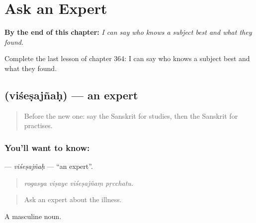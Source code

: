
\chapter{Ask an Expert}
\label{ch:sa-ask-an-expert}

\begin{chapteropening}
\textbf{By the end of this chapter:} \emph{I can say who knows a subject best and what they found.}

Complete the last lesson of chapter 364: I can say who knows a subject best and what they found.
\end{chapteropening}

\section[\texorpdfstring{\sk{विशेषज्ञः} (viśeṣajñaḥ)}{विशेषज्ञः (viśeṣajñaḥ)}]{ (viśeṣajñaḥ) — an expert}

\label{lesson:SA-C364-visesajnah}



\begin{quote}
Before the new one: say the Sanskrit for studies, then the Sanskrit for practises.
\end{quote}

\subsection*{You'll want to know: }
\textbf{} — \emph{viśeṣajñaḥ} — \textquotedblleft{}an expert\textquotedblright{}.

\begin{quote}
   
\end{quote}

\begin{quote}
\emph{rogasya viṣaye viśeṣajñaṃ pṛcchatu.}
\end{quote}

\begin{quote}
Ask an expert about the illness.
\end{quote}

A masculine noun.


